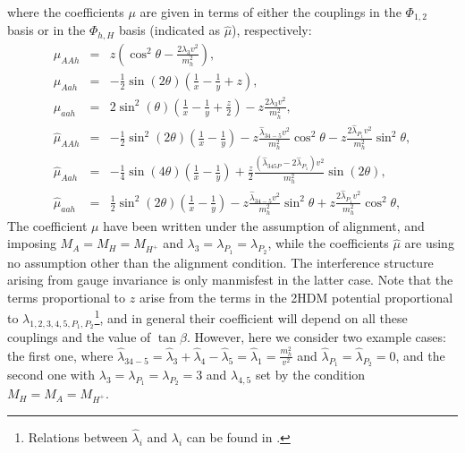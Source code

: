 where the coefficients $\mu$ are given in terms of either the couplings in the $\Phi_{1,2}$ basis or in the $\Phi_{h,H}$ basis (indicated as $\hat{\mu}$), respectively:
\begin{eqnarray}
\mu_{AAh} &=& z\left(\cos^2\theta-\frac{2\lambda_3v^2}{m_h^2}\right), \label{eq:mu11h}\\
\mu_{Aah} &=& -\frac{1}{2}\sin(2\theta)\left(\frac{1}{x}-\frac{1}{y}+z\right),  \label{eq:mu12h}\\
\mu_{aah} &=& 2\sin^2(\theta)\left(\frac{1}{x}-\frac{1}{y}+\frac{z}{2}\right) -z\frac{2\lambda_3 v^2}{m_h^2},\label{eq:mu22h}\\
\hat{\mu}_{AAh} &=& -\frac{1}{2}\sin^2(2\theta)\left(\frac{1}{x}-\frac{1}{y}\right) - z\frac{\hat{\lambda}_{34-5}v^2}{m_h^2}\cos^2\theta -z\frac{2\hat{\lambda}_{P_1}v^2}{m_h^2}\sin^2\theta,  \label{eq:muAAh}\\
\hat{\mu}_{Aah} &=& -\frac{1}{4}\sin(4\theta)\left(\frac{1}{x}-\frac{1}{y}\right) + \frac{z}{2}\frac{(\hat{\lambda}_{345P}-2\hat{\lambda}_{P_1}) v^2}{m_h^2}\sin(2\theta), \label{eq:muaAh}\\
\hat{\mu}_{aah} &=& \frac{1}{2}\sin^2(2\theta)\left(\frac{1}{x}-\frac{1}{y}\right) -z\frac{\hat{\lambda}_{34-5}v^2}{m_h^2}\sin^2\theta +z\frac{2\hat{\lambda}_{P_1}v^2}{m_h^2}\cos^2\theta ,\label{eq:muaah}
\end{eqnarray}
The coefficient $\mu$ have been written under the assumption of alignment, and imposing $M_A=M_H=M_{H^+}$ and $\lambda_3=\lambda_{P_1}=\lambda_{P_2}$, while the coefficients $\hat{\mu}$ are using no assumption other than the alignment condition. The interference structure arising from gauge invariance is only manmisfest in the latter case.
Note that the terms proportional to $z$ arise from the terms in the 2HDM potential proportional to $\lambda_{1,2,3,4,5, P_1, P_2}$\footnote{Relations between $\hat{\lambda}_i$ and $\lambda_i$ can be found in \citep{Bell:2017rgi}.}, and in general their coefficient will depend on all these couplings and the value of $\tan\beta$. However, here we consider two example cases: the first one, where $\hat{\lambda}_{34-5}=\hat{\lambda}_3+\hat{\lambda}_4-\hat{\lambda}_5=\hat{\lambda}_1=\frac{m_h^2}{v^2}$ and $\hat{\lambda}_{P_1}=\hat{\lambda}_{P_2}=0$, and the second one with $\lambda_3=\lambda_{P_1}=\lambda_{P_2}=3$ and $\lambda_{4,5}$ set by the condition $M_H=M_A=M_{H^+}$. 


